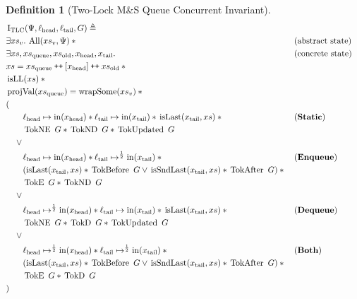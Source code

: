 \documentclass[a4paper, 10pt]{report}
\theoremstyle{definition}
\newtheorem{definition}{Definition}[section]
\newcommand{\msq}{M\&S Queue}
\newcommand{\tlmsq}{Two-Lock \msq{}}
\newcommand{\TLQueueInvariantConc}{\operatorname{I_{TLC}}}
\newcommand{\xsc}{xs}
\newcommand{\xsqueue}{xs_{\mathrm{queue}}}
\newcommand{\xsold}{xs_{\mathrm{old}}}
\newcommand{\isLL}{\operatorname{isLL}}
\newcommand{\AllP}{\operatorname{All}}
\newcommand{\projval}{\operatorname{projVal}}
\newcommand{\wrapsome}{\operatorname{wrapSome}}
\newcommand{\isLast}{\operatorname{isLast}}
\newcommand{\isSndLast}{\operatorname{isSndLast}}
\newcommand{\locN}[1]{\loc_{\mathrm{#1}}}
\newcommand{\lochead}{\locN{head}}
\newcommand{\loctail}{\locN{tail}}
\newcommand{\nIn}[1]{\operatorname{in}(#1)}
\newcommand{\node}{x}
\newcommand{\nodeN}[1]{\node_{\mathrm{#1}}}
\newcommand{\nodehead}{\nodeN{head}}
\newcommand{\nodetail}{\nodeN{tail}}
\newcommand{\absvalueList}{xs_v}
\newcommand{\StaticState}{\textbf{Static}\xspace}
\newcommand{\EnqueueState}{\textbf{Enqueue}\xspace}
\newcommand{\DequeueState}{\textbf{Dequeue}\xspace}
\newcommand{\BothState}{\textbf{Both}\xspace}
\newcommand{\Qg}{G}
\newcommand{\TokE}[1]{\operatorname{TokE} ~ #1}
\newcommand{\TokEQg}{\TokE{\Qg}}
\newcommand{\TokNE}[1]{\operatorname{TokNE} ~ #1}
\newcommand{\TokNEQg}{\TokNE{\Qg}}
\newcommand{\TokD}[1]{\operatorname{TokD} ~ #1}
\newcommand{\TokDQg}{\TokD{\Qg}}
\newcommand{\TokND}[1]{\operatorname{TokND} ~ #1}
\newcommand{\TokNDQg}{\TokND{\Qg}}
\newcommand{\TokBefore}[1]{\operatorname{TokBefore} ~ #1}
\newcommand{\TokBeforeQg}{\TokBefore{\Qg}}
\newcommand{\TokAfter}[1]{\operatorname{TokAfter} ~ #1}
\newcommand{\TokAfterQg}{\TokAfter{\Qg}}
\newcommand{\TokUpdated}[1]{\operatorname{TokUpdated} ~ #1}
\newcommand{\TokUpdatedQg}{\TokUpdated{\Qg}}
\newcommand\catenate{\mathbin{\text{\ttfamily\upshape ++}}}
\begin{document}
\begin{definition}[\tlmsq{} Concurrent Invariant]\label{TLMSQ:spec:conc:invariant}
  \begin{align*}
    &\TLQueueInvariantConc(\Psi, \lochead, \loctail, \Qg) \eqdef\\
    &\Exists \absvalueList. \AllP(\absvalueList, \Psi) \star{} &&\text{(abstract state)}\\
    &\Exists \xsc, \xsqueue, \xsold, \nodehead, \nodetail . &&\text{(concrete state)}\\
    &\xsc = \xsqueue \catenate [\nodehead] \catenate \xsold \star{}\\
    &\isLL(\xsc) \star{}\\
    &\projval(\xsqueue) = \wrapsome(\absvalueList) \star{}\\
    &(\\
    &\quad\quad\lochead \mapsto \nIn{\nodehead} \star{} \loctail \mapsto \nIn{\nodetail} \star{} \isLast(\nodetail, \xsc) \star{} &&\text{(\StaticState)}\\
    &\quad\quad \TokNEQg \star{} \TokNDQg \star{} \TokUpdatedQg\\
    &\quad\lor{}\\
    &\quad\quad\lochead \mapsto \nIn{\nodehead} \star{} \loctail \mapsto^{\frac{1}{2}} \nIn{\nodetail} \star{} &&\text{(\EnqueueState)}\\
    &\quad\quad (\isLast(\nodetail, \xsc) \star{} \TokBeforeQg \lor{} \isSndLast(\nodetail, \xsc) \star{} \TokAfterQg) \star{}\\
    &\quad\quad \TokEQg \star{} \TokNDQg\\
    &\quad\lor{}\\
    &\quad\quad\lochead \mapsto^{\frac{1}{2}} \nIn{\nodehead} \star{} \loctail \mapsto \nIn{\nodetail} \star{} \isLast(\nodetail, \xsc) \star{} &&\text{(\DequeueState)}\\
    &\quad\quad \TokNEQg \star{} \TokDQg \star{} \TokUpdatedQg\\
    &\quad\lor{}\\
    &\quad\quad\lochead \mapsto^{\frac{1}{2}} \nIn{\nodehead} \star{} \loctail \mapsto^{\frac{1}{2}} \nIn{\nodetail} \star{} &&\text{(\BothState)}\\
    &\quad\quad (\isLast(\nodetail, \xsc) \star{} \TokBeforeQg \lor{} \isSndLast(\nodetail, \xsc) \star{} \TokAfterQg) \star{} \\
    &\quad\quad \TokEQg \star{} \TokDQg\\
    &)
  \end{align*}
\end{definition}
\end{document}
